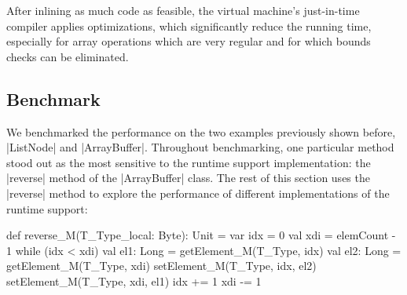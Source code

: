 After inlining as much code as feasible, the virtual machine's just-in-time compiler applies optimizations, which significantly reduce the running time, especially for array operations which are very regular and for which bounds checks can be eliminated.
\subsection{Benchmark}
\label{mbox:subsec-mb-bench}

We benchmarked the performance on the two examples previously shown before, |ListNode| and |ArrayBuffer|. Throughout benchmarking, one particular method stood out as the most sensitive to the runtime support implementation: the |reverse| method of the |ArrayBuffer| class. The rest of this section uses the |reverse| method to explore the performance of different implementations of the runtime support:

\begin{lstlisting-nobreak}
 def reverse_M(T_Type_local: Byte): Unit = {
   var idx = 0
   val xdi = elemCount - 1
   while (idx < xdi) {
     val el1: Long = getElement_M(T_Type, idx)
     val el2: Long = getElement_M(T_Type, xdi)
     setElement_M(T_Type, idx, el2)
     setElement_M(T_Type, xdi, el1)
     idx += 1
     xdi -= 1
   }
 }
\end{lstlisting-nobreak}

\newcommand{\optpm}[1]{}

